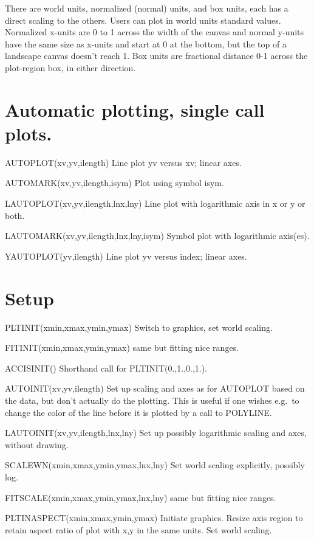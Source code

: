 \documentclass[12pt]{article}
\newif \iftth
\begin{document}
There are world units, normalized (normal) units, and box units, each
has a direct scaling to the others. Users can plot in world units
standard values. Normalized x-units are 0 to 1 across the width of the
canvas and normal y-units have the same size as x-units and start at 0
at the bottom, but the top of a landscape canvas doesn't reach 1. Box
units are fractional distance 0-1 across the plot-region box, in
either direction.

\section{Automatic plotting, single call plots.}

\iftth \special{html:<a href="plottest.f"><img align="right" src="plainplot.png"></a>}\fi
AUTOPLOT(xv,yv,ilength) Line plot yv versus xv; linear axes.

AUTOMARK(xv,yv,ilength,isym) Plot using symbol isym.

LAUTOPLOT(xv,yv,ilength,lnx,lny) Line plot with logarithmic axis in x
or y or both.

LAUTOMARK(xv,yv,ilength,lnx,lny,isym) Symbol plot with logarithmic axis(es).
 
YAUTOPLOT(yv,ilength) Line plot yv versus index; linear axes.


\section{Setup}

PLTINIT(xmin,xmax,ymin,ymax) Switch to graphics, set world scaling.

FITINIT(xmin,xmax,ymin,ymax) same but fitting nice ranges.

ACCISINIT() Shorthand call for PLTINIT(0.,1.,0.,1.).

AUTOINIT(xv,yv,ilength) Set up scaling and axes as for AUTOPLOT based
on the data, but don't actually do the plotting. This is useful if one
wishes e.g.\  to change the color of the line before it is plotted by
a call to POLYLINE.

LAUTOINIT(xv,yv,ilength,lnx,lny) Set up possibly logarithmic scaling
and axes, without drawing.

SCALEWN(xmin,xmax,ymin,ymax,lnx,lny) Set world scaling explicitly, possibly log.

FITSCALE(xmin,xmax,ymin,ymax,lnx,lny) same but fitting nice ranges.

PLTINASPECT(xmin,xmax,ymin,ymax) Initiate graphics. Resize axis region
to retain aspect ratio of plot with x,y in the same units. Set world scaling.
\end{document}
